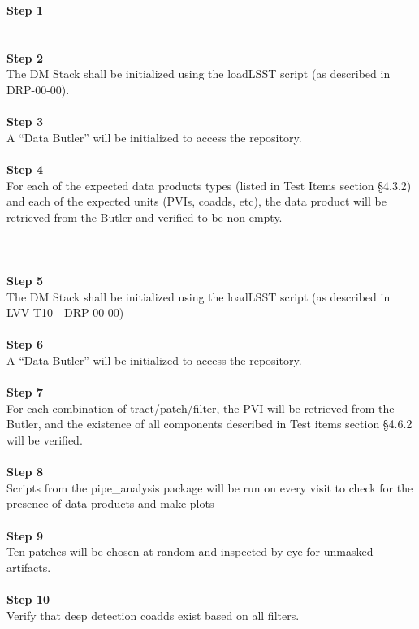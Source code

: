 \textbf{Step 1}\\
~\\
~\\
\textbf{Step 2}\\
The DM Stack shall be initialized using the loadLSST script (as
described in DRP-00-00).\\
~\\
\textbf{Step 3}\\
A ``Data Butler'' will be initialized to access the repository.\\
~\\
\textbf{Step 4}\\
For each of the expected data products types (listed in Test Items
section §4.3.2) and each of the expected units (PVIs, coadds, etc), the
data product will be retrieved from the Butler and verified to be
non-empty.\\
~\\
~\\
~\\
\textbf{Step 5}\\
The DM Stack shall be initialized using the loadLSST script (as
described in LVV-T10 - DRP-00-00)\\
~\\
\textbf{Step 6}\\
A ``Data Butler'' will be initialized to access the repository.\\
~\\
\textbf{Step 7}\\
For each combination of tract/patch/filter, the PVI will be retrieved
from the Butler, and the existence of all components described in Test
items section §4.6.2 will be verified.\\
~\\
\textbf{Step 8}\\
Scripts from the pipe\_analysis package will be run on every visit to
check for the presence of data products and make plots\\
~\\
\textbf{Step 9}\\
Ten patches will be chosen at random and inspected by eye for unmasked
artifacts.\\
~\\
\textbf{Step 10}\\
Verify that deep detection coadds exist based on all filters.\\
~\\
~\\
~\\


